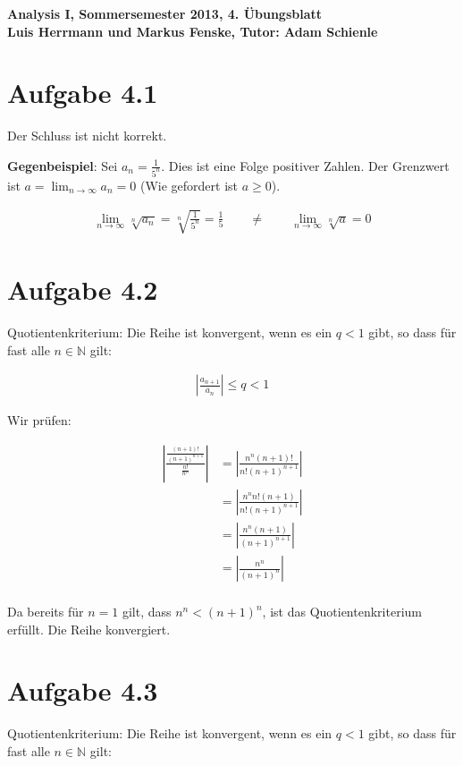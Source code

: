 \documentclass[a4paper,german,12pt,smallheadings]{scrartcl}
\begin{document}
\begin{center}
\bfseries %
\sffamily %
\vspace{-40pt}
Analysis I, Sommersemester 2013, 4. Übungsblatt \\
Luis Herrmann und Markus Fenske, Tutor: Adam Schienle
\vspace{-10pt}
\end{center}

\section*{Aufgabe 4.1}
Der Schluss ist nicht korrekt.

\textbf{Gegenbeispiel}: Sei $a_n = \frac{1}{5^n}$. Dies ist eine Folge positiver Zahlen.
Der Grenzwert ist $ a = \lim_{n \to \infty} a_n = 0$ (Wie gefordert ist $a \ge
0$).

\begin{align*}
  \lim_{n \to \infty} \sqrt[n]{a_n} = \sqrt[n]{\frac{1}{5^n}} = \frac{1}{5}\qquad \neq\qquad \lim_{n \to \infty} \sqrt[n]{a} = 0
\end{align*}

\section*{Aufgabe 4.2}
Quotientenkriterium: Die Reihe ist konvergent, wenn es ein $q < 1$ gibt, so
dass für fast alle $n \in \mathbb{N}$ gilt:

\begin{align*}
  \left| \frac{a_{n+1}}{a_n} \right| \le q < 1
\end{align*}

Wir prüfen:

\begin{align*}
  \left| \frac{\frac{(n+1)!}{(n+1)^{n+1}}}{\frac{n!}{n^n}} \right| &= \left| \frac{n^n(n+1)!}{n!(n+1)^{n+1}} \right| \\ 
  &= \left| \frac{n^n n! (n+1)}{n!(n+1)^{n+1}} \right| \\
  &= \left| \frac{n^n (n+1)}{(n+1)^{n+1}} \right| \\
  &= \left| \frac{n^n}{(n+1)^{n}} \right| \\
\end{align*}

Da bereits für $n=1$ gilt, dass $n^n < (n+1)^n$, ist das Quotientenkriterium
erfüllt. Die Reihe konvergiert.


\section*{Aufgabe 4.3}
Quotientenkriterium: Die Reihe ist konvergent, wenn es ein $q < 1$ gibt, so
dass für fast alle $n \in \mathbb{N}$ gilt:
\end{document}
